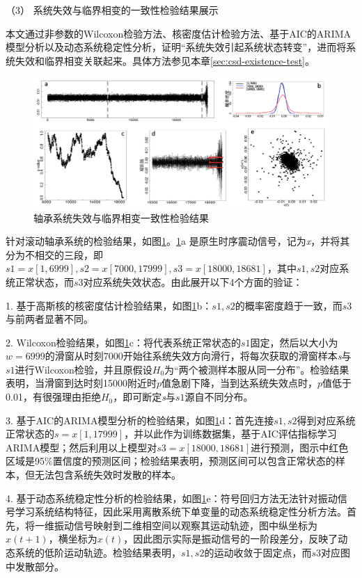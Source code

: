 （3） 系统失效与临界相变的一致性检验结果展示

本文通过非参数的Wilcoxon检验方法、核密度估计检验方法、基于AIC的ARIMA模型分析以及动态系统稳定性分析，证明“系统失效引起系统状态转变”，进而将系统失效和临界相变关联起来。具体方法参见本章\ref{sec:csd-existence-test}。

\begin{figure}[H]
\centering
\includegraphics[scale=0.5]{figures/csd/csd-proof-bearing.png}
\caption{轴承系统失效与临界相变一致性检验结果}
\label{fig:csd-proof-bearing}
\end{figure}
针对滚动轴承系统的检验结果，如图\ref{fig:csd-proof-bearing}。\ref{fig:csd-proof-bearing}a 是原生时序震动信号，记为\emph{x}，并将其分为不相交的三段，即$s1=x[1,6999], s2=x[7000,17999], s3=x[18000, 18681]$，其中$s1,s2$对应系统正常状态，而$s3$对应系统失效状态。由此展开以下4个方面的验证：

1. 基于高斯核的核密度估计检验结果，如图\ref{fig:csd-proof-bearing}b：$s1,s2$的概率密度趋于一致，而$s3$与前两者显著不同。

2. Wilcoxon检验结果，如图\ref{fig:csd-proof-bearing}c：将代表系统正常状态的$s1$固定，然后以大小为$w=6999$的滑窗从时刻7000开始往系统失效方向滑行，将每次获取的滑窗样本\emph{s}与$s1$进行Wilcoxon检验，并且原假设$H_{0}$为“两个被测样本服从同一分布”。检验结果表明，当滑窗到达时刻15000附近时$p$值急剧下降，当到达系统失效点时，$p$值低于0.01，有很强理由拒绝$H_{0}$，即可断定\emph{s}与$s1$源自不同分布。

3. 基于AIC的ARIMA模型分析的检验结果，如图\ref{fig:csd-proof-bearing}d：首先连接$s1,s2$得到对应系统正常状态的$s=x[1,17999]$，并以此作为训练数据集，基于AIC评估指标学习ARIMA模型；然后利用以上模型对$s3=x[18000, 18681]$进行预测，图示中红色区域是95\%置信度的预测区间；检验结果表明，预测区间可以包含正常状态的样本，但无法包含系统失效时发散的样本。

4. 基于动态系统稳定性分析的检验结果，如图\ref{fig:csd-proof-bearing}e：符号回归方法无法针对振动信号学习系统结构特征，因此采用离散系统下单变量的动态系统稳定性分析方法。首先，将一维振动信号映射到二维相空间以观察其运动轨迹，图中纵坐标为$x(t+1)$，横坐标为$x(t)$，因此图示实际是振动信号的一阶段差分，反映了动态系统的低阶运动轨迹。检验结果表明，$s1,s2$的运动收敛于固定点，而$s3$对应图中发散部分。


